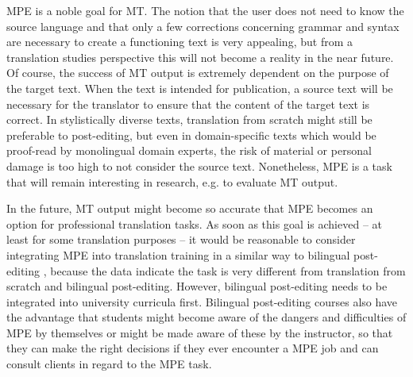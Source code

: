 \documentclass[output=paper]{langsci/langscibook}
\begin{document}
MPE is a noble goal for MT. The notion that the user does not need to know the source language and that only a few corrections concerning grammar and syntax are necessary to create a functioning text is very appealing, but from a translation studies perspective this will not become a reality in the near future. Of course, the success of MT output is extremely dependent on the purpose of the target text. When the text is intended for publication, a source text will be necessary for the translator to ensure that the content of the target text is correct. In stylistically diverse texts, translation from scratch might still be preferable to post-editing, but even in domain-specific texts which would be proof-read by monolingual domain experts, the risk of material or personal damage is too high to not consider the source text. Nonetheless, MPE is a task that will remain interesting in research, e.g. to evaluate MT output.



In the future, MT output might become so accurate that MPE becomes an option for professional translation tasks. As soon as this goal is achieved -- at least for some translation purposes -- it would be reasonable to consider integrating MPE into translation training in a similar way to bilingual post-editing \citep{obrien2002}, because the data indicate the task is very different from translation from scratch and bilingual post-editing. However, bilingual post-editing needs to be integrated into university curricula first. Bilingual post-editing courses also have the advantage that students might become aware of the dangers and difficulties of MPE by themselves or might be made aware of these by the instructor, so that they can make the right decisions if they ever encounter a MPE job and can consult clients in regard to the MPE task.
\end{document}
